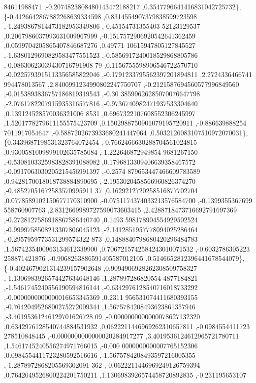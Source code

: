 \begin{DoxyCode}
      84611988471 ,-0.2074823808480143472188217 ,0.3547796641416831042725732\},
\{-0.4126642867882268639334598 ,0.8314554907379838599723598 ,-1.2493867814473182953349806 ,-0.45154731355403
      52123129537 ,0.2067986037993631009967999 ,-0.1517572906920542641362459 ,0.0599704205865407846687276 ,0.49771
      10615947805127845527 ,-1.6380129690829583477551523 ,-0.5856917240018529868805786 ,-0.08630623039430716791908
      79 ,0.1156755598906546722570710 ,-0.0225793915113356585822046 ,-0.1791233795562397201894811 ,2.2724336466741
      994478013567 ,2.8400991234990802247750707 ,-0.2121587694560577996849560 ,-0.0153893836757186819319543 ,-0.30
      38599626285070076647798 ,-2.0761782207915935316577816 ,-0.9736740982471937533304640 ,0.139124528570036321006
      8531 ,0.6967322107608552306245997 ,1.5201778279611155575423709 ,0.1502988750901079195720911 ,-0.886639888254
      7011917054647 ,-0.5887202673933680241447064 ,0.5032126083107510972070031\},
\{0.3439687198531323764072454 ,-0.7662466630288704561024815 ,0.9300581009899102635785084 ,-1.222646872949854
      9681267150 ,-0.5308103325983828391088082 ,0.1796813309406639358467572 ,-0.0917063030205215456991397 ,-0.2574
      879653447466609783589 ,0.9428170018018738884890695 ,-2.1953020458566960826374270 ,-0.48527051672583570995911
      37 ,0.1629212720258516877702704 ,0.0778589102150677170310900 ,-0.0751174374033213576584700 ,-0.1399355367699
      558760907763 ,2.8312669989727599073603415 ,2.4288718473716692791697369 ,-0.2728127586918867586440740 ,0.1493
      598178904554929502524 ,-0.9999758508213307806045123 ,-2.1412851957778094025286464 ,-0.2957959773531299574322
      873 ,0.1488840798680420296484783 ,1.5674235400963134612339900 ,0.7067215742584243010071532 ,-0.6032786305223
      258871421876 ,-0.9068263886591405587012105 ,0.5146652812396441678544079\},
\{-0.4024679021314239157902648 ,0.9094906928262308509758327 ,-1.1306983926574427634648146 ,1.287897286820554
      4877184821 ,-1.5461745240556190594816144 ,-0.6342976128540716018733292 ,-0.0000000000000016653345369 ,0.2311
      956531074411680393155 ,-0.7642049526800275272009344 ,1.5675784208493623861357946 ,-3.40195361246129701626728
      09 ,-0.0000000000000078627132320 ,0.6342976128540744884531932 ,0.0622211446969262310657811 ,-0.0984554411723
      278510848445 ,-0.0000000000000020284917277 ,3.4019536124612965721780711 ,1.5461745240556274971766015 ,-0.000
      0000000000007765152306 ,0.0984554411723280592516616 ,-1.5675784208493597216005355 ,-1.2878972868205569302091
      362 ,-0.0622211446969249126759394 ,0.7642049526800224201750211 ,1.1306983926574458720892835 ,-0.231195653107

\end{DoxyCode}
